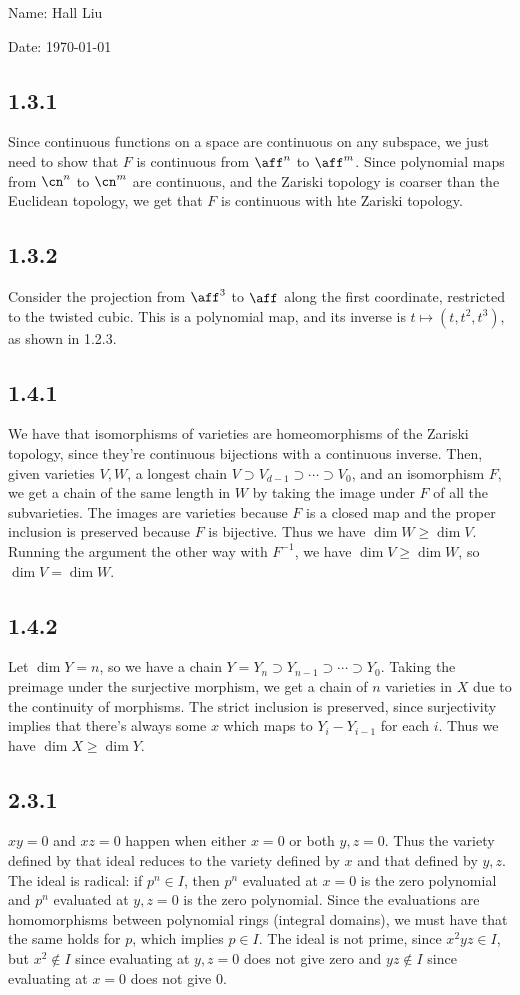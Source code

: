 \documentclass{article}
\begin{document}
Name: Hall Liu

Date: \today 
\vspace{1.5cm}
\subsection*{1.3.1}
Since continuous functions on a space are continuous on any subspace, we just need to show that $F$ is continuous from $\aff^n$ to $\aff^m$. Since polynomial maps from $\cn^n$ to $\cn^m$ are continuous, and the Zariski topology is coarser than the Euclidean topology, we get that $F$ is continuous with hte Zariski topology.
\subsection*{1.3.2}
Consider the projection from $\aff^3$ to $\aff$ along the first coordinate, restricted to the twisted cubic. This is a polynomial map, and its inverse is $t\mapsto(t,t^2,t^3)$, as shown in 1.2.3. 
\subsection*{1.4.1}
We have that isomorphisms of varieties are homeomorphisms of the Zariski topology, since they're continuous bijections with a continuous inverse. Then, given varieties $V,W$, a longest chain $V\supset V_{d-1}\supset\cdots\supset V_0$, and an isomorphism $F$, we get a chain of the same length in $W$ by taking the image under $F$ of all the subvarieties. The images are varieties because $F$ is a closed map and the proper inclusion is preserved because $F$ is bijective. Thus we have $\dim W\geq\dim V$. Running the argument the other way with $F^{-1}$, we have $\dim V\geq\dim W$, so $\dim V=\dim W$.
\subsection*{1.4.2}
Let $\dim Y=n$, so we have a chain $Y=Y_n\supset Y_{n-1}\supset\cdots\supset Y_0$. Taking the preimage under the surjective morphism, we get a chain of $n$ varieties in $X$ due to the continuity of morphisms. The strict inclusion is preserved, since surjectivity implies that there's always some $x$ which maps to $Y_i-Y_{i-1}$ for each $i$. Thus we have $\dim X\geq\dim Y$.
\subsection*{2.3.1}
$xy=0$ and $xz=0$ happen when either $x=0$ or both $y,z=0$. Thus the variety defined by that ideal reduces to the variety defined by $x$ and that defined by $y,z$. The ideal is radical: if $p^n\in I$, then $p^n$ evaluated at $x=0$ is the zero polynomial and $p^n$ evaluated at $y,z=0$ is the zero polynomial. Since the evaluations are homomorphisms between polynomial rings (integral domains), we must have that the same holds for $p$, which implies $p\in I$. The ideal is not prime, since $x^2yz\in I$, but $x^2\not\in I$ since evaluating at $y,z=0$ does not give zero and $yz\not\in I$ since evaluating at $x=0$ does not give $0$.
\end{document}
